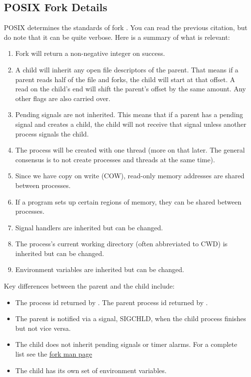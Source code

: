 \subsection{POSIX Fork Details}

POSIX determines the standards of fork \cite{fork_2018}.
You can read the previous citation, but do note that it can be quite verbose.
Here is a summary of what is relevant:

\begin{enumerate}
    \item Fork will return a non-negative integer on success.
    \item A child will inherit any open file descriptors of the parent.
          That means if a parent reads half of the file and forks, the child will start at that offset.
          A read on the child's end will shift the parent's offset by the same amount.
          Any other flags are also carried over.
    \item Pending signals are not inherited.
          This means that if a parent has a pending signal and creates a child, the child will not receive that signal unless another process signals the child.
    \item The process will be created with one thread (more on that later. The general consensus is to not create processes and threads at the same time).
    \item Since we have copy on write (COW), read-only memory addresses are shared between processes.
    \item If a program sets up certain regions of memory, they can be shared between processes.
    \item Signal handlers are inherited but can be changed.
    \item The process's current working directory (often abbreviated to CWD) is inherited but can be changed.
    \item Environment variables are inherited but can be changed.
\end{enumerate}

Key differences between the parent and the child include:
\begin{itemize}
    \item The process id returned by .
          The parent process id returned by .
    \item The parent is notified via a signal, SIGCHLD, when the child process finishes but not vice versa.
    \item The child does not inherit pending signals or timer alarms.
          For a complete list see the \href{http://man7.org/linux/man-pages/man2/fork.2.html}{fork man page}
    \item The child has its own set of environment variables.
\end{itemize}

